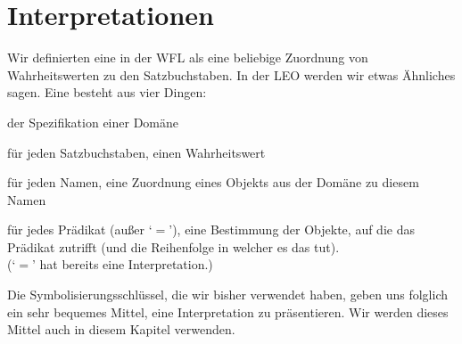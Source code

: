 \section{Interpretationen}
Wir definierten eine  in der WFL als eine beliebige Zuordnung von Wahrheitswerten zu den Satzbuchstaben. In der LEO werden wir etwas Ähnliches sagen. Eine  besteht aus vier Dingen:
	\begin{ebullet}	
		\item der Spezifikation einer Domäne
		\item für jeden Satzbuchstaben, einen Wahrheitswert
		\item für jeden Namen, eine Zuordnung eines Objekts aus der Domäne zu diesem Namen 
		\item für jedes Prädikat (au{\ss}er `$=$'), eine Bestimmung der Objekte, auf die das Prädikat zutrifft (und die Reihenfolge in welcher es das tut).
		\\ (`$=$' hat bereits eine Interpretation.)
	\end{ebullet}
Die Symbolisierungsschlüssel, die wir bisher verwendet haben, geben uns folglich ein sehr bequemes Mittel, eine Interpretation zu präsentieren. Wir werden dieses Mittel auch in diesem Kapitel verwenden.


